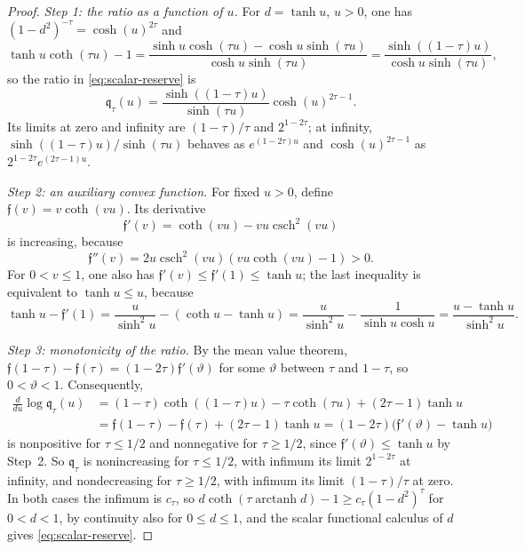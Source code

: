 \documentclass[11pt]{amsart}
\numberwithin{equation}{section}
\theoremstyle{definition}
\newcommand{\arctanh}{\operatorname{arctanh}}
\begin{document}
\begin{proof}
\emph{Step 1: the ratio as a function of \(u\).} For \(d=\tanh u\),
\(u>0\), one has \((1-d^2)^{-\tau}=\cosh(u)^{2\tau}\) and
\[
 \tanh u\coth(\tau u)-1
 =\frac{\sinh u\cosh(\tau u)-\cosh u\sinh(\tau u)}
       {\cosh u\sinh(\tau u)}
 =\frac{\sinh((1-\tau)u)}{\cosh u\sinh(\tau u)},
\]
so the ratio in \eqref{eq:scalar-reserve} is
\[
 \mathfrak q_\tau(u)
 =\frac{\sinh((1-\tau)u)}{\sinh(\tau u)}
   \cosh(u)^{2\tau-1}.
\]
Its limits at zero and infinity are \((1-\tau)/\tau\) and
\(2^{1-2\tau}\); at infinity, \(\sinh((1-\tau)u)/{\sinh(\tau u)}\)
behaves as \(e^{(1-2\tau)u}\) and \(\cosh(u)^{2\tau-1}\) as
\(2^{1-2\tau}e^{(2\tau-1)u}\).

\smallskip
\emph{Step 2: an auxiliary convex function.} For fixed \(u>0\), define
\(\mathfrak f(v)=v\coth(vu)\). Its derivative
\[
 \mathfrak f'(v)
 =\coth(vu)-vu\operatorname{csch}^2(vu)
\]
is increasing, because
\[
 \mathfrak f''(v)
 =2u\operatorname{csch}^2(vu)(vu\coth(vu)-1)>0.
\]
For \(0<v\le1\), one also has
\(\mathfrak f'(v)\le\mathfrak f'(1)\le\tanh u\);
the last inequality is equivalent to \(\tanh u\le u\), because
\[
 \tanh u-\mathfrak f'(1)
 =\frac u{\sinh^2u}-(\coth u-\tanh u)
 =\frac u{\sinh^2u}-\frac1{\sinh u\cosh u}
 =\frac{u-\tanh u}{\sinh^2u}.
\]

\smallskip
\emph{Step 3: monotonicity of the ratio.} By the mean value theorem,
\(\mathfrak f(1-\tau)-\mathfrak f(\tau)=(1-2\tau)\mathfrak f'(\vartheta)\)
for some \(\vartheta\) between \(\tau\) and \(1-\tau\), so
\(0<\vartheta<1\). Consequently,
\begin{align*}
 \frac d{du}\log\mathfrak q_\tau(u)
 &=(1-\tau)\coth((1-\tau)u)-\tau\coth(\tau u)+(2\tau-1)\tanh u\\
 &=\mathfrak f(1-\tau)-\mathfrak f(\tau)
  +(2\tau-1)\tanh u
 =(1-2\tau)\bigl(\mathfrak f'(\vartheta)-\tanh u\bigr)
\end{align*}
is nonpositive for \(\tau\le1/2\) and nonnegative for
\(\tau\ge1/2\), since \(\mathfrak f'(\vartheta)\le\tanh u\) by Step~2.
So \(\mathfrak q_\tau\) is nonincreasing for \(\tau\le1/2\), with
infimum its limit \(2^{1-2\tau}\) at infinity, and nondecreasing for
\(\tau\ge1/2\), with infimum its limit \((1-\tau)/\tau\) at zero. In
both cases the infimum is \(c_\tau\), so
\(d\coth(\tau\arctanh d)-1\ge c_\tau(1-d^2)^\tau\) for \(0<d<1\), by
continuity also for \(0\le d\le1\), and the scalar functional calculus
of \(d\) gives \eqref{eq:scalar-reserve}.
\end{proof}
\end{document}

